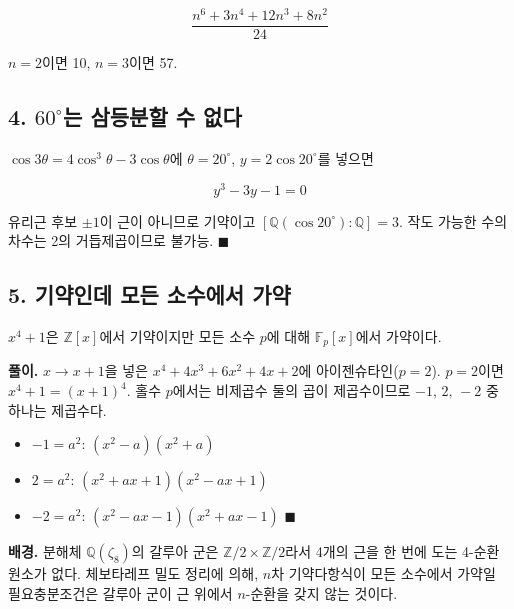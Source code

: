 \[
\frac{n^6+3n^4+12n^3+8n^2}{24}
\]

\(n=2\)이면 10, \(n=3\)이면 57.

\subsection{\texorpdfstring{4. \(60^\circ\)는 삼등분할 수 없다}{4. 60\^{}\textbackslash circ는 삼등분할 수 없다}}

\(\cos3\theta=4\cos^3\theta-3\cos\theta\)에 \(\theta=20^\circ\),
\(y=2\cos20^\circ\)를 넣으면

\[
y^3-3y-1=0
\]

유리근 후보 \(\pm1\)이 근이 아니므로 기약이고
\([\mathbb Q(\cos20^\circ):\mathbb Q]=3\). 작도 가능한 수의 차수는 2의
거듭제곱이므로 불가능. \(\blacksquare\)

\subsection{5. 기약인데 모든 소수에서 가약}

\(x^4+1\)은 \(\mathbb Z[x]\)에서 기약이지만 모든 소수 \(p\)에 대해
\(\mathbb F_p[x]\)에서 가약이다.

\textbf{풀이.} \(x\to x+1\)을 넣은 \(x^4+4x^3+6x^2+4x+2\)에
아이젠슈타인(\(p=2\)). \(p=2\)이면 \(x^4+1=(x+1)^4\). 홀수 \(p\)에서는
비제곱수 둘의 곱이 제곱수이므로 \(-1,\,2,\,-2\) 중 하나는 제곱수다.

\begin{itemize}
\tightlist
\item
  \(-1=a^2\): \((x^2-a)(x^2+a)\)
\item
  \(2=a^2\): \((x^2+ax+1)(x^2-ax+1)\)
\item
  \(-2=a^2\): \((x^2-ax-1)(x^2+ax-1)\) \(\blacksquare\)
\end{itemize}

\textbf{배경.} 분해체 \(\mathbb Q(\zeta_8)\)의 갈루아 군은
\(\mathbb Z/2\times\mathbb Z/2\)라서 4개의 근을 한 번에 도는 4-순환
원소가 없다. 체보타레프 밀도 정리에 의해, \(n\)차 기약다항식이 모든
소수에서 가약일 필요충분조건은 갈루아 군이 근 위에서 \(n\)-순환을 갖지
않는 것이다.
